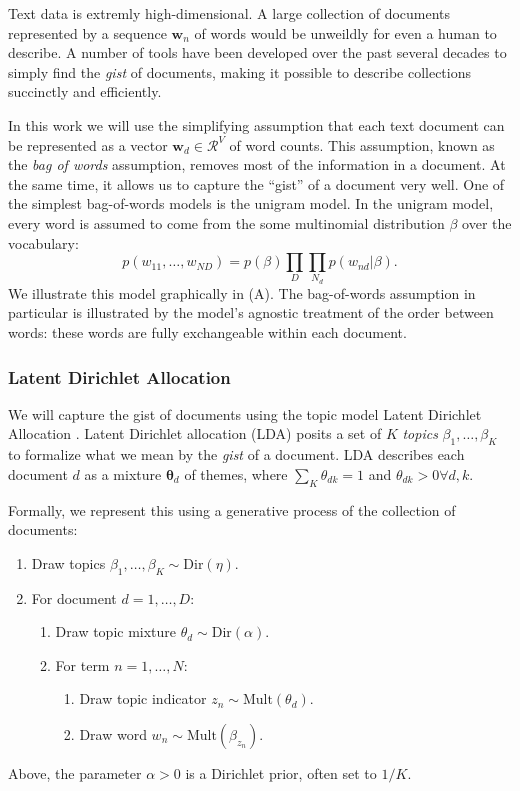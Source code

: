   
  Text data is extremly high-dimensional.  A large collection of
  documents represented by a sequence $\bm w_n$ of words would be
  unweildly for even a human to describe.  A number of tools have been
  developed over the past several decades to simply find the
  \emph{gist} of documents, making it possible to describe collections
  succinctly and efficiently.

  In this work we will use the simplifying assumption that each text
  document can be represented as a vector $\bm w_d \in \mathcal{R}^V$
  of word counts.  This assumption, known as the \emph{bag of words}
  assumption, removes most of the information in a document.  At the
  same time, it allows us to capture the ``gist'' of a document very
  well. One of the simplest bag-of-words models is the unigram
  model. In the unigram model, every word is assumed to come from the
  some multinomial distribution $\beta$ over the vocabulary:
  \[
    p(w_{11}, \ldots, w_{ND}) = p(\beta) \prod_D \prod_{N_d} p(w_{nd} |
  \beta). \]
  We illustrate this model graphically in
   (A).  The bag-of-words assumption in
  particular is illustrated by the model's agnostic treatment of the
  order between words: these words are fully exchangeable within each
  document.

\subsubsection{Latent Dirichlet Allocation}
We will capture the gist of documents using the topic model Latent
Dirichlet Allocation \cite{blei:2003}.  Latent Dirichlet allocation
(LDA) posits a set of $K$ \emph{topics} $\beta_1, \ldots, \beta_K$ to
formalize what we mean by the \emph{gist} of a document.  LDA describes each
document $d$ as a mixture $\bm \theta_d$ of themes, where $\sum_K
\theta_{dk} = 1$ and $\theta_{dk} > 0 \forall d,k$.

Formally, we represent this using a generative process of the collection of documents:
\begin{enumerate}
  \item Draw topics $\beta_1, \ldots, \beta_K \sim \mbox{Dir}(\eta)$.
    \item For document $d=1, \ldots, D$:
    \begin{enumerate}
    \item Draw topic mixture $\theta_d \sim \mbox{Dir}(\alpha)$.
    \item For term $n=1, \ldots, N$:
      \begin{enumerate}
      \item Draw topic indicator $z_n \sim \mbox{Mult}(\theta_d)$.
      \item Draw word $w_n \sim \mbox{Mult}(\beta_{z_n})$.
      \end{enumerate}
    \end{enumerate}
\end{enumerate}
Above, the parameter $\alpha > 0$ is a Dirichlet prior, often set to
$1/K$.

